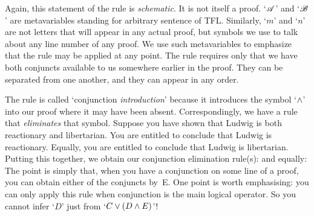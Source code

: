 Again, this statement of the rule is \emph{schematic}. It is not
itself a proof. `$\mathscr{A}$' and `$\mathscr{B}$' are metavariables
standing for arbitrary sentence of TFL. Similarly, `$m$' and `$n$' are
not letters that will appear in any actual proof, but symbols we use
to talk about any line number of any proof. We use such metavariables to
emphasize that the rule may be applied at any point. The rule requires
only that we have both conjuncts available to us somewhere earlier in
the proof. They can be separated from one another, and they can appear
in any order.

The rule is called `conjunction \emph{introduction}' because it introduces the symbol `$\wedge$' into our proof where it may have been absent. Correspondingly, we have a rule that \emph{eliminates} that symbol.  Suppose you have shown that Ludwig is both reactionary and libertarian. You are entitled to conclude that Ludwig is reactionary. Equally, you are entitled to conclude that Ludwig is libertarian. Putting this together, we obtain our conjunction elimination rule(s):
and equally:
The point is simply that, when you have a conjunction on some line of a proof, you can obtain either of the conjuncts by~{\eand}E. One point is worth emphasising: you can only apply this rule when conjunction is the main logical operator. So you cannot infer `$D$' just from `$C \vee (D \wedge E)$'!

